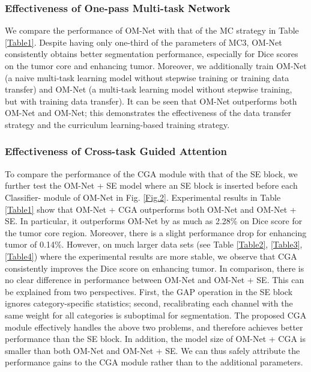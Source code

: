 \documentclass[journal,twoside]{IEEEtran}
\begin{document}
\subsubsection{Effectiveness of One-pass Multi-task Network}
We compare the performance of OM-Net with that of the MC strategy in Table \ref{Table1}. Despite having only one-third of the parameters of MC3, OM-Net consistently obtains better segmentation performance, especially for Dice scores on the tumor core and enhancing tumor. Moreover, we additionally train OM-Net (a naive multi-task learning model without stepwise training or training data transfer) and OM-Net (a multi-task learning model without stepwise training, but with training data transfer). It can be seen that OM-Net outperforms both OM-Net and OM-Net; this demonstrates the effectiveness of the data transfer strategy and the curriculum learning-based training strategy. 







\subsubsection{Effectiveness of Cross-task Guided Attention}
To compare the performance of the CGA module with that of the SE block, we further test the OM-Net + SE model where an SE block is inserted before each Classifier-  module of OM-Net in Fig. \ref{Fig.2}. Experimental results in Table \ref{Table1} show that OM-Net + CGA outperforms both OM-Net and OM-Net + SE. In particular, it outperforms OM-Net by as much as 2.28\% on Dice score for the tumor core region. Moreover, there is a slight performance drop for enhancing tumor of 0.14\%. However, on much larger data sets (see Table \ref{Table2}, \ref{Table3}, \ref{Table4}) where the experimental results are more stable, we observe that CGA consistently improves the Dice score on enhancing tumor. In comparison, there is no clear difference in performance between OM-Net and OM-Net + SE. This can be explained from two perspectives. First, the GAP operation in the SE block ignores category-specific statistics; second, recalibrating each channel with the same weight for all categories is suboptimal for segmentation. The proposed CGA module effectively handles the above two problems, and therefore achieves better performance than the SE block. In addition, the model size of OM-Net + CGA is smaller than both OM-Net and OM-Net + SE. We can thus safely attribute the performance gains to the CGA module rather than to the additional parameters.
\end{document}
